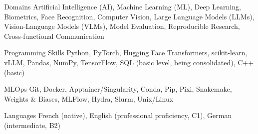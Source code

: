 

\begin{cvskills}

  \cvskill
    {Domains} %
    {Artificial Intelligence (AI), Machine Learning (ML), Deep Learning, Biometrics, Face Recognition, Computer Vision, Large Language Models (LLMs), Vision-Language Models (VLMs), Model Evaluation, Reproducible Research, Cross-functional Communication} %

  \cvskill
    {Programming Skills} %
    {Python, PyTorch, Hugging Face Transformers, scikit-learn, vLLM, Pandas, NumPy, TensorFlow, SQL (basic level, being consolidated), C++ (basic)} %

  \cvskill
    {MLOps} %
    {Git, Docker, Apptainer/Singularity, Conda, Pip, Pixi, Snakemake, Weights \& Biases, MLFlow, Hydra, Slurm, Unix/Linux} %

  \cvskill
    {Languages} %
    {French (native), English (professional proficiency, C1), German (intermediate, B2)} %

\end{cvskills}

